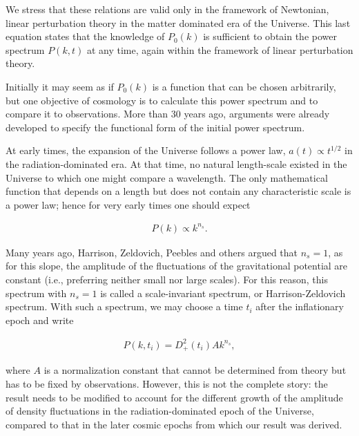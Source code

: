 \documentclass[a4paper,11pt]{article}
\begin{document}
{\noindent}We stress that these relations are valid only in the framework of Newtonian, linear perturbation theory in the matter dominated era of the Universe. This last equation states that the knowledge of $P_0(k)$ is sufficient to obtain the power spectrum $P(k,t)$ at any time, again within the framework of linear perturbation theory.

{\noindent}Initially it may seem as if $P_0(k)$ is a function that can be chosen arbitrarily, but one objective of cosmology is to calculate this power spectrum and to compare it to observations. More than 30 years ago, arguments were already developed to specify the functional form of the initial power spectrum.

{\noindent}At early times, the expansion of the Universe follows a power law, $a(t)\propto t^{1/2}$ in the radiation-dominated era. At that time, no natural length-scale existed in the Universe to which one might compare a wavelength. The only mathematical function that depends on a length but does not contain any characteristic scale is a power law; hence for very early times one should expect

\begin{align*}
    P(k) \propto k^{n_s}.
\end{align*}

{\noindent}Many years ago, Harrison, Zeldovich, Peebles and others argued that $n_s=1$, as for this slope, the amplitude of the fluctuations of the gravitational potential are constant (i.e., preferring neither small nor large scales). For this reason, this spectrum with $n_s=1$ is called a scale-invariant spectrum, or Harrison-Zeldovich spectrum. With such a spectrum, we may choose a time $t_i$ after the inflationary epoch and write

\begin{align*}
    P(k,t_i) = D_+^2(t_i)Ak^{n_s},
\end{align*}

{\noindent}where $A$ is a normalization constant that cannot be determined from theory but has to be fixed by observations. However, this is not the complete story: the result needs to be modified to account for the different growth of the amplitude of density fluctuations in the radiation-dominated epoch of the Universe, compared to that in the later cosmic epochs from which our result was derived.
\end{document}
